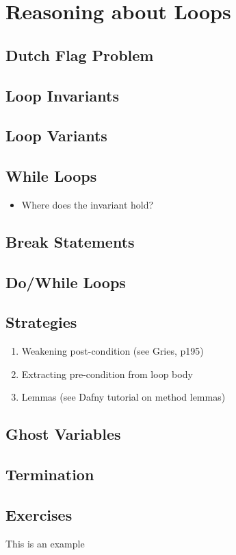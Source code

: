 \chapter{Reasoning about Loops}
\label{c_reasoning_loops}

\section{Dutch Flag Problem}

\section{Loop Invariants}
\section{Loop Variants}
\section{While Loops}
\begin{itemize}
\item Where does the invariant hold?
\end{itemize}
\section{Break Statements}
\section{Do/While Loops}
\section{Strategies}
\begin{enumerate}
\item Weakening post-condition (see Gries, p195)
\item Extracting pre-condition from loop body
\item Lemmas (see Dafny tutorial on method lemmas)
\end{enumerate}
\section{Ghost Variables}

\section{Termination}
\section{Exercises}

\begin{ex}
This is an example
\end{ex}